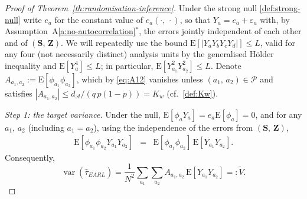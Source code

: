 \documentclass[sigconf,nonacm]{acmart}
\newcommand{\E}{\mathrm E}
\DeclareMathOperator{\var}{var}
\begin{document}
\begin{proof}[Proof of Theorem~\ref{th:randomisation-inference}]
    Under the strong null \eqref{def:strong-null} write $e_a$ for the constant value of $e_a(\cdot,\,\cdot)$, so that $Y_a = e_a + \varepsilon_a$ with, by Assumption~A\ref{a:no-autocorrelation}$^*$, the errors jointly independent of each other and of $(\mathbf S,\,\mathbf Z)$. We will repeatedly use the bound $\E[|Y_{a}Y_{b}Y_{c}Y_{d}|]\le L$, valid for any four (not necessarily distinct) analysis units by the generalised H\"older inequality and $\E[Y_a^4]\le L$; in particular, $\E[Y_{a_1}^2Y_{a_2}^2]\le L$. Denote $A_{a_1,a_2} := \E[\phi_{a_1}\phi_{a_2}]$, which by \eqref{eq:A12} vanishes unless $(a_1,\,a_2)\in\mathcal P$ and satisfies $|A_{a_1,a_2}|\le d_{\mathcal A}/(q\,p(1-p)) = K_w$ (cf.~\eqref{def:Kw}).

    \emph{Step 1: the target variance.} Under the null, $\E[\phi_aY_a] = e_a\E[\phi_a] = 0$, and for any $a_1,\,a_2$ (including $a_1=a_2$), using the independence of the errors from $(\mathbf S,\,\mathbf Z)$,
    \begin{eqnarray*}
        \E[\phi_{a_1}\phi_{a_2}Y_{a_1}Y_{a_2}] &=& \E[\phi_{a_1}\phi_{a_2}]\,\E[Y_{a_1}Y_{a_2}].
    \end{eqnarray*}
    Consequently,
    \begin{equation}\label{eq:var-null}
        \var(\hat\tau^{\phantom{1}}_{EARL}) = \frac 1{N^2}\sum_{a_1}\sum_{a_2}A_{a_1,a_2}\,\E[Y_{a_1}Y_{a_2}] =: \tilde V.
    \end{equation}


\end{proof}
\end{document}

